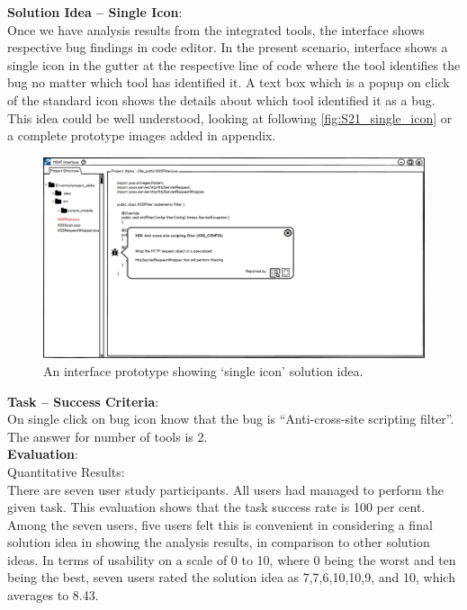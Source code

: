\textbf{Solution Idea – Single Icon}: \\

Once we have analysis results from the integrated tools, the interface shows respective bug findings in code editor. In the present scenario, interface shows a single icon in the gutter at the respective line of code where the tool identifies the bug no matter which tool has identified it. A text box which is a popup on click of the standard icon shows the details about which tool identified it as a bug. This idea could be well understood, looking at following \autoref{fig:S21_single_icon} or a complete prototype images added in appendix. \\

\begin{figure}[hbt!]
	\centering
	\includegraphics[width=\linewidth]{figures/solution_ideas_snaps/S21_single_icon}
	\caption{An interface prototype showing ‘single icon’ solution idea.}
	\label{fig:S21_single_icon}
\end{figure}

\textbf{Task – Success Criteria}: \\

On single click on bug icon know that the bug is “Anti-cross-site scripting filter”. The answer for number of tools is 2. \\

\textbf{Evaluation}: \\

Quantitative Results: \\

There are seven user study participants. All users had managed to perform the given task. This evaluation shows that the task success rate is 100 per cent. \\

Among the seven users, five users felt this is convenient in considering a final solution idea in showing the analysis results, in comparison to other solution ideas. In terms of usability on a scale of 0 to 10, where 0 being the worst and ten being the best, seven users rated the solution idea as 7,7,6,10,10,9, and 10, which averages to 8.43. \\


